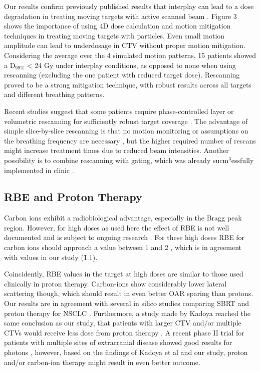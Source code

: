 \documentclass[type=dr, dr=rernat, acm$^3$entcolor=tud7b,colorbacktitle, bigchapter, openright, twoside, 12pt ]{tudthesis}
\begin{document}
Our results confirm previously published results that interplay can lead to a dose degradation in treating moving targets with active scanned beam \cite{Bert2008}. 
Figure 3 shows the importance of using 4D dose calculation and motion mitigation techniques in treating moving targets with particles. 
Even small motion amplitude can lead to underdosage in CTV without proper motion mitigation. Considering the average over the 4 simulated motion patterns, 15 patients showed a D$_{99\%}$ < 24 Gy under interplay 
conditions, as opposed to none when using rescanning (excluding the one patient with reduced target dose). Rescanning proved to be a strong mitigation technique, with robust results across all targets and different breathing patterns.

Recent studies suggest that some patients require phase-controlled layer or volumetric rescanning for sufficiently robust target coverage \cite{Mori2013,Takahashi2014}. 
The advantage of simple slice-by-slice rescanning is that no motion monitoring or assumptions on the breathing frequency are necessary \cite{Bert2011}, but the higher required number of rescans 
might increase treatment times due to reduced beam intensities. Another possibility is to combine rescanning with gating, which was already sucm$^{3}$essfully implemented in clinic \cite{Rossi2016}.




\subsection{RBE and Proton Therapy}

Carbon ions exhibit a radiobiological advantage, especially in the Bragg peak region. However, for high doses as used here the effect of RBE is not well documented and is subject to ongoing research \cite{Friedrich2014}. 
For these high doses RBE for carbon ions should approach a value between 1 and 2 \cite{Carabe2007}, which is in agreement with values in our study (\~ 1.1).

Coincidently, RBE values in the target at high doses are similar to those used clinically in proton therapy. Carbon-ions show considerably lower lateral scattering though, which should result in even better 
OAR sparing than protons. Our results are in agreement with several in silico studies comparing SBRT and proton therapy for NSCLC \cite{Roelofs2012, Kadoya2010, Register2010}. 
Furthermore, a study made by Kadoya reached the same conclusion as our study, that patients with larger CTV and/or multiple CTVs would  receive less dose from proton therapy \cite{Kadoya2010}.
A recent phase II trial for patients with multiple sites of extracranial disease showed good results for photons \cite{Iyengar2014}, however, based on the findings of Kadoya et al and our study, 
proton and/or carbon-ion therapy might result in even better outcome. 
\end{document}
